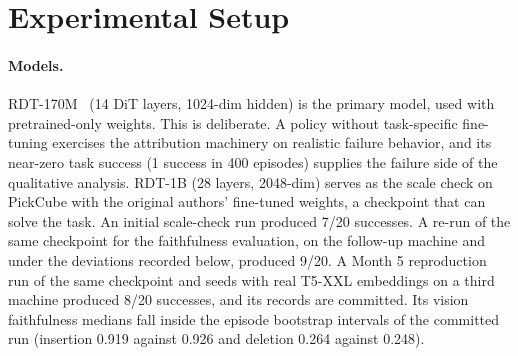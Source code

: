\documentclass{article}
\begin{document}
\section{Experimental Setup}
\label{sec:setup}

\paragraph{Models.}
RDT-170M~\cite{liu2024rdt} (14 DiT layers, 1024-dim hidden) is the primary model, used with pretrained-only weights.
This is deliberate.
A policy without task-specific fine-tuning exercises the attribution machinery on realistic failure behavior, and its near-zero task success (1 success in 400 episodes) supplies the failure side of the qualitative analysis.
RDT-1B (28 layers, 2048-dim) serves as the scale check on PickCube with the original authors' fine-tuned weights, a checkpoint that can solve the task.
An initial scale-check run produced 7/20 successes.
A re-run of the same checkpoint for the faithfulness evaluation, on the follow-up machine and under the deviations recorded below, produced 9/20.
A Month 5 reproduction run of the same checkpoint and seeds with real T5-XXL embeddings on a third machine produced 8/20 successes, and its records are committed.
Its vision faithfulness medians fall inside the episode bootstrap intervals of the committed run (insertion 0.919 against 0.926 and deletion 0.264 against 0.248).
\end{document}
